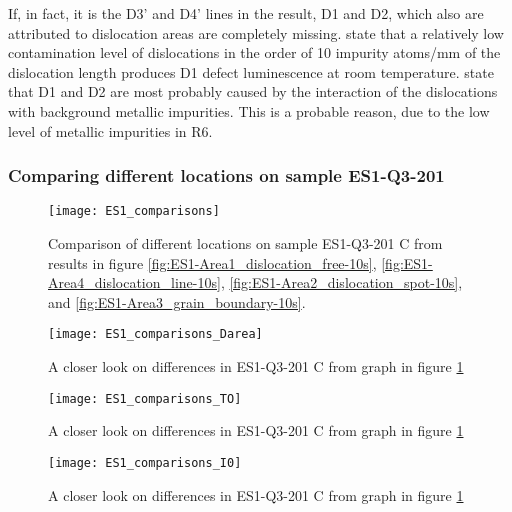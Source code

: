 If, in fact, it is the D3' and D4' lines in the result, D1 and D2, which also are attributed to dislocation areas are completely missing. \cite{kitler02} state that a relatively low contamination level of dislocations in the order of 10 impurity atoms/mm of the dislocation length produces D1 defect luminescence at room temperature. \cite{arguirov07} state that D1 and D2 are most probably caused by the interaction of the dislocations with background metallic impurities. This is a probable reason, due to the low level of metallic impurities in R6.



\subsubsection{Comparing different locations on sample ES1-Q3-201}

\begin{figure}[H]
\centering
\texttt{[image: ES1\_comparisons]}
\caption[ES1-Q3-201 comparisons]{Comparison of different locations on sample ES1-Q3-201 C from results in figure \ref{fig:ES1-Area1_dislocation_free-10s}, \ref{fig:ES1-Area4_dislocation_line-10s}, \ref{fig:ES1-Area2_dislocation_spot-10s}, and \ref{fig:ES1-Area3_grain_boundary-10s}. }
\label{fig:ES1_comparisons}%
\end{figure}

\begin{figure}[H]
\centering
\texttt{[image: ES1\_comparisons\_Darea]}
\caption[ES1-Q3-201 comparisons close]{A closer look on differences in ES1-Q3-201 C from graph in figure \ref{fig:ES1_comparisons} }
\label{fig:ES1_comparisons_Darea}%
\end{figure}

\begin{figure}[H]
\centering
\texttt{[image: ES1\_comparisons\_TO]}
\caption[ES1-Q3-201 comparisons close]{A closer look on differences in ES1-Q3-201 C from graph in figure \ref{fig:ES1_comparisons} }
\label{fig:ES1_comparisons_TO}%
\end{figure}

\begin{figure}[H]
\centering
\texttt{[image: ES1\_comparisons\_I0]}
\caption[ES1-Q3-201 comparisons close]{A closer look on differences in ES1-Q3-201 C from graph in figure \ref{fig:ES1_comparisons} }
\label{fig:ES1_comparisons_I0}%
\end{figure}


